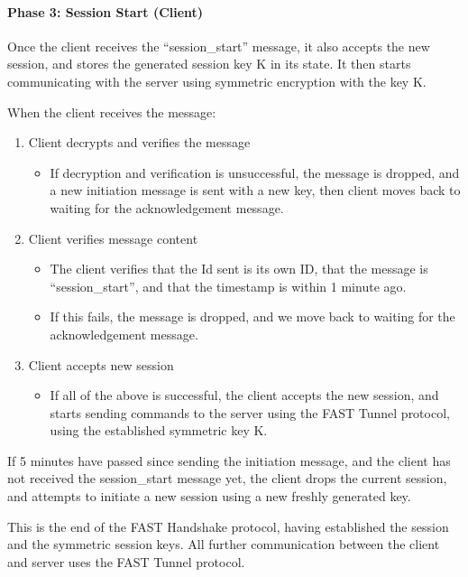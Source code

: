 \documentclass[12pt]{article}
\begin{document}
\paragraph{Phase 3: Session Start (Client)}

Once the client receives the “session\_start” message, it also accepts the new session, and stores the generated session key K in its state. It then starts communicating with the server using symmetric encryption with the key K.

\noindent When the client receives the message:

\begin{enumerate}
    \item Client decrypts and verifies the message
    \begin{itemize}
        \item If decryption and verification is unsuccessful, the message is dropped, and a new initiation message is sent with a new key, then client moves back to waiting for the acknowledgement message.
    \end{itemize}
    \item Client verifies message content
    \begin{itemize}
        \item The client verifies that the Id sent is its own ID, that the message is “session\_start”, and that the timestamp is within 1 minute ago.
        \item If this fails, the message is dropped, and we move back to waiting for the acknowledgement message.
    \end{itemize}
    \item Client accepts new session
    \begin{itemize}
        \item If all of the above is successful, the client accepts the new session, and starts sending commands to the server using the FAST Tunnel protocol, using the established symmetric key K.
    \end{itemize}
\end{enumerate}

If 5 minutes have passed since sending the initiation message, and the client has not received the session\_start message yet, the client drops the current session, and attempts to initiate a new session using a new freshly generated key.


This is the end of the FAST Handshake protocol, having established the session and the symmetric session keys. All further communication between the client and server uses the FAST Tunnel protocol.
\end{document}
